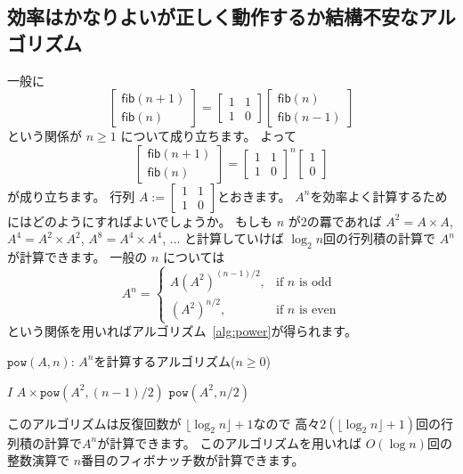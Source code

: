 \documentclass[a4paper,twoside,onecolumn,openany,article]{memoir}
\theoremstyle{plain}
\theoremstyle{remark}
\begin{document}
\subsection{効率はかなりよいが正しく動作するか結構不安なアルゴリズム}
一般に
\begin{equation*}
\begin{bmatrix}
\mathsf{fib}(n+1)\\
\mathsf{fib}(n)
\end{bmatrix}
=
\begin{bmatrix}
1&1\\
1&0
\end{bmatrix}
\begin{bmatrix}
\mathsf{fib}(n)\\
\mathsf{fib}(n-1)
\end{bmatrix}
\end{equation*}
という関係が $n\ge 1$ について成り立ちます。
よって
\begin{equation*}
\begin{bmatrix}
\mathsf{fib}(n+1)\\
\mathsf{fib}(n)
\end{bmatrix}
=
\begin{bmatrix}
1&1\\
1&0
\end{bmatrix}^n
\begin{bmatrix}
1\\0
\end{bmatrix}
\end{equation*}
が成り立ちます。
行列 $A:=
\begin{bmatrix}
1&1\\
1&0
\end{bmatrix}$とおきます。
$A^n$を効率よく計算するためにはどのようにすればよいでしょうか。
もしも $n$ が2の羃であれば $A^2 = A\times A$, $A^4= A^2 \times A^2$, $A^8 = A^4\times A^4$, $\dotsc$
と計算していけば $\log_2 n$回の行列積の計算で $A^n$ が計算できます。
一般の $n$ については
\begin{equation*}
A^n = \begin{cases}
A (A^2)^{(n-1)/2},& \text{if $n$ is odd}\\
(A^2)^{n/2},& \text{if $n$ is even}
\end{cases}
\end{equation*}
という関係を用いればアルゴリズム~\ref{alg:power}が得られます。
%
\begin{algorithm}[H]
\caption{$\mathtt{pow}(A,n)$: $A^n$を計算するアルゴリズム($n\ge 0$)}
\label{alg:power}
\begin{algorithmic}
  \State \Return $I$
  \State \Return $A\times\mathtt{pow}(A^2, (n-1)/2)$
\Else
  \State \Return $\mathtt{pow}(A^2, n/2)$
\EndIf
\end{algorithmic}
\end{algorithm}
%
このアルゴリズムは反復回数が $\lfloor \log_2 n\rfloor+1$なので
高々$2(\lfloor \log_2 n\rfloor+1)$回の行列積の計算で$A^n$が計算できます。
このアルゴリズムを用いれば $O(\log n)$回の整数演算で $n$番目のフィボナッチ数が計算できます。
\end{document}
